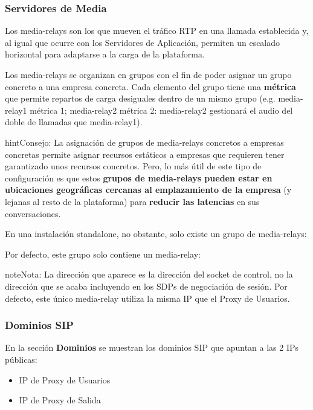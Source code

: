 \documentclass[letterpaper,10pt,spanish]{sphinxmanual}
\begin{document}
\subsubsection{Servidores de Media}
\label{internal_calls/god_portal:servidores-de-media}
Los media-relays son los que mueven el tráfico RTP en una llamada establecida y, al igual que ocurre con los Servidores de Aplicación, permiten un escalado horizontal para adaptarse a la carga de la plataforma.

Los media-relays se organizan en grupos con el fin de poder asignar un grupo concreto a una empresa concreta. Cada elemento del grupo tiene una \textbf{métrica} que permite repartos de carga desiguales dentro de un mismo grupo (e.g. media-relay1 métrica 1; media-relay2 métrica 2: media-relay2 gestionará el audio del doble de llamadas que media-relay1).

\begin{notice}{hint}{Consejo:}
La asignación de grupos de media-relays concretos a empresas concretas permite asignar recursos estáticos a empresas que requieren tener garantizado unos recursos concretos. Pero, lo más útil de este tipo de configuración es que estos \textbf{grupos de media-relays pueden estar en ubicaciones geográficas cercanas al emplazamiento de la empresa} (y lejanas al resto de la plataforma) para \textbf{reducir las latencias} en sus conversaciones.
\end{notice}

En una instalación standalone, no obstante, solo existe un grupo de media-relays:

\noindent{}

Por defecto, este grupo solo contiene un media-relay:

\noindent{}

\begin{notice}{note}{Nota:}
La dirección que aparece es la dirección del socket de control, no la dirección que se acaba incluyendo en los SDPs de negociación de sesión. Por defecto, este único media-relay utiliza la misma IP que el Proxy de Usuarios.
\end{notice}


\subsubsection{Dominios SIP}
\label{internal_calls/god_portal:dominios-sip}\label{internal_calls/god_portal:god-sipdomains}
En la sección \textbf{Dominios} se muestran los dominios SIP que apuntan a las 2 IPs públicas:
\begin{itemize}
\item {} 
IP de Proxy de Usuarios

\item {} 
IP de Proxy de Salida

\end{itemize}
\end{document}
